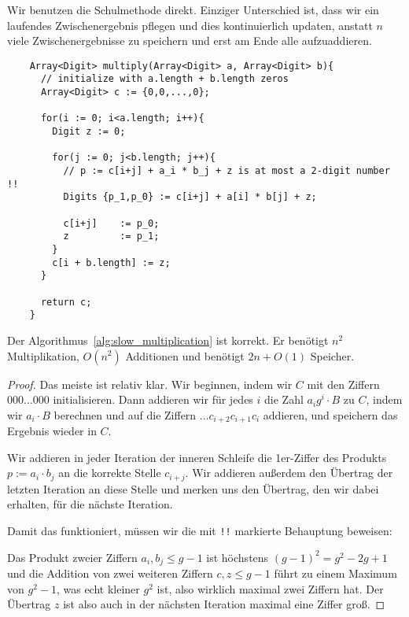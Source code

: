 \begin{algorithm}
    \label{alg:slow_multiplication}
    Wir benutzen die Schulmethode direkt. Einziger Unterschied ist, dass wir ein laufendes Zwischenergebnis pflegen und dies kontinuierlich updaten, anstatt $n$ viele Zwischenergebnisse zu speichern und erst am Ende alle aufzuaddieren.

    \begin{lstlisting}
    Array<Digit> multiply(Array<Digit> a, Array<Digit> b){
      // initialize with a.length + b.length zeros
      Array<Digit> c := {0,0,...,0};

      for(i := 0; i<a.length; i++){
        Digit z := 0;

        for(j := 0; j<b.length; j++){
          // p := c[i+j] + a_i * b_j + z is at most a 2-digit number !!
          Digits {p_1,p_0} := c[i+j] + a[i] * b[j] + z;

          c[i+j]    := p_0;
          z         := p_1;
        }
        c[i + b.length] := z;
      }

      return c;
    }
    \end{lstlisting}
\end{algorithm}

\begin{proposition}[Korrektheit]
    Der Algorithmus~\ref{alg:slow_multiplication} ist korrekt. Er benötigt $n^2$ Multiplikation, $O(n^2)$ Additionen und benötigt $2n+O(1)$ Speicher.
\end{proposition}
\begin{proof}
    Das meiste ist relativ klar. Wir beginnen, indem wir $C$ mit den Ziffern $000\ldots 000$ initialisieren. Dann addieren wir für jedes $i$ die Zahl $a_i g^i\cdot B$ zu $C$, indem wir $a_i \cdot B$ berechnen und auf die Ziffern $\ldots c_{i+2}c_{i+1}c_i$ addieren, und speichern das Ergebnis wieder in $C$.

    \smallskip
    Wir addieren in jeder Iteration der inneren Schleife die 1er-Ziffer des Produkts $p:=a_i \cdot b_j$ an die korrekte Stelle $c_{i+j}$. Wir addieren außerdem den Übertrag der letzten Iteration an diese Stelle und merken uns den Übertrag, den wir dabei erhalten, für die nächste Iteration.

    \smallskip
    Damit das funktioniert, müssen wir die mit \lstinline{!!} markierte Behauptung beweisen:

    Das Produkt zweier Ziffern $a_i,b_j\leq g-1$ ist höchstens $(g-1)^2=g^2-2g+1$ und die Addition von zwei weiteren Ziffern $c,z\leq g-1$ führt zu einem Maximum von $g^2-1$, was echt kleiner $g^2$ ist, also wirklich maximal zwei Ziffern hat. Der Übertrag $z$ ist also auch in der nächsten Iteration maximal eine Ziffer groß.
\end{proof}

